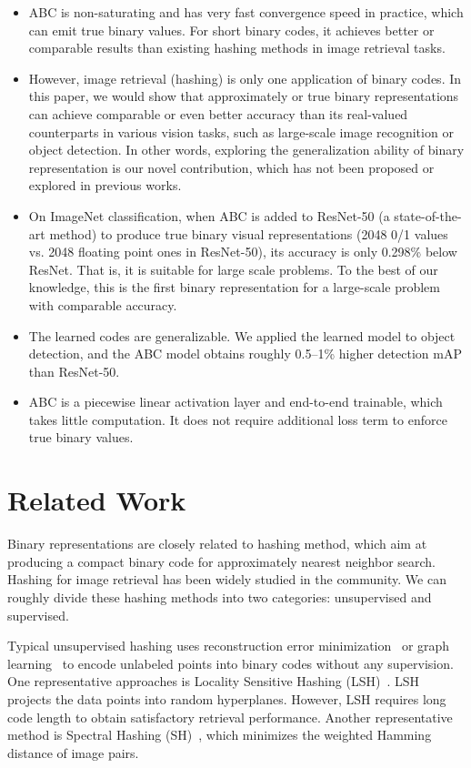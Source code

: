\documentclass[runningheads]{llncs}
\begin{document}
\begin{itemize}
	\item ABC is non-saturating and has very fast convergence speed in practice, which can emit true binary values. For short binary codes, it achieves better or comparable results than existing hashing methods in image retrieval tasks.
	
	\item However, image retrieval (hashing) is only one application of binary codes. In this paper, we would show that approximately or true binary representations can achieve comparable or even better accuracy than its real-valued counterparts in various vision tasks, such as large-scale image recognition or object detection. In other words, exploring the generalization ability of binary representation is our novel contribution, which has not been proposed or explored in previous works.
	
	\item On ImageNet classification, when ABC is added to ResNet-50 (a state-of-the-art method) to produce true binary visual representations (2048 0/1 values vs. 2048 floating point ones in ResNet-50), its accuracy is only 0.298\% below ResNet. That is, it is suitable for large scale problems. To the best of our knowledge, this is the first binary representation for a large-scale problem with comparable accuracy.
	
	\item The learned codes are generalizable. We applied the learned model to object detection, and the ABC model obtains roughly 0.5--1\% higher detection mAP than ResNet-50.
	
	\item ABC is a piecewise linear activation layer and end-to-end trainable, which takes little computation. It does not require additional loss term to enforce true binary values.
\end{itemize}

\section{Related Work}

Binary representations are closely related to hashing method, which aim at producing a compact binary code for approximately nearest neighbor search. Hashing for image retrieval has been widely studied in the community. We can roughly divide these hashing methods into two categories: unsupervised and supervised.

Typical unsupervised hashing uses reconstruction error minimization~\cite{Gionis99VLDB_LSH,Gong11CVPR_r1,Jegou11PAMI_r2} or graph learning~\cite{Weiss14NIPS_r3,Liu11ICML_r4,Liu14NIPS_r5} to encode unlabeled points into binary codes without any supervision. One representative approaches is Locality Sensitive Hashing (LSH)~\cite{Gionis99VLDB_LSH}. LSH projects the data points into random hyperplanes. However, LSH requires long code length to obtain satisfactory retrieval performance. Another representative method is Spectral Hashing (SH)~\cite{Weiss14NIPS_r3}, which minimizes the weighted Hamming distance of image pairs. 
\end{document}
